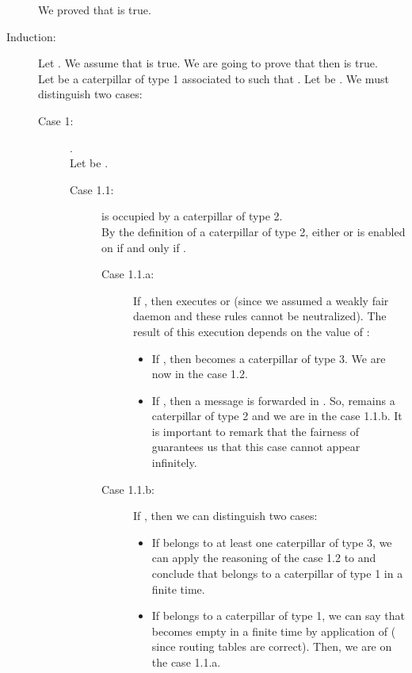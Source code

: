 \documentclass[11pt]{article}
\newenvironment{proof}{{\noindent\bf Proof. } }{{\hfill }}
\begin{document}
\begin{proof}
\begin{description}
We proved that  is true.

\item [Induction:] Let . We assume that  is true. We are going to prove that then  is true.\\
Let  be a caterpillar of type 1 associated to  such that . Let be . We must distinguish two cases:

\begin{description}
\item [Case 1:] .\\
Let be .

\begin{description}
\item [Case 1.1:]  is occupied by a caterpillar  of type 2.\\
By the definition of a caterpillar of type 2, either  or  is enabled on  if and only if .

\begin{description}
\item [Case 1.1.a:] If , then  executes  or  (since we assumed a weakly fair daemon and these rules cannot be neutralized). The result of this execution depends on the value of :

\begin{itemize}
\item If , then  becomes a caterpillar of type 3. We are now in the case 1.2. 
\item If , then a message   is forwarded in . So,  remains a caterpillar of type 2 and we are in the case 1.1.b. It is important to remark that the fairness of  guarantees us that this case cannot appear infinitely. 
\end{itemize}

\item [Case 1.1.b:] If , then we can distinguish two cases:

\begin{itemize}
\item If  belongs to at least one caterpillar of type 3, we can apply the reasoning of the case 1.2 to  and conclude that  belongs to a caterpillar of type 1 in a finite time. 
\item If  belongs to a caterpillar of type 1, we can say that  becomes empty in a finite time by application of  ( since routing tables are correct). Then, we are on the case 1.1.a. 
\end{itemize}

\end{description}


\end{description}
\end{description}
\end{description}
\end{proof}
\end{document}
